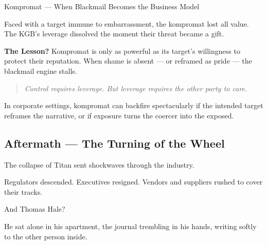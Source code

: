 \begin{HistoricalSidebar}{Kompromat --- When Blackmail Becomes the Business Model}
    \medskip
    
    Faced with a target immune to embarrassment, the kompromat lost all value.  
    The KGB’s leverage dissolved the moment their threat became a gift.
    
    \medskip
    
    \textbf{The Lesson?}  
    Kompromat is only as powerful as its target’s willingness to protect their reputation.  
    When shame is absent --- or reframed as pride --- the blackmail engine stalls.
    
    \begin{quote}
    \textit{Control requires leverage. But leverage requires the other party to care.}
    \end{quote}
    
    In corporate settings, kompromat can backfire spectacularly if the intended target reframes the narrative, or if exposure turns the coercer into the exposed.
    
\end{HistoricalSidebar}


\subsection{Aftermath --- The Turning of the Wheel}

The collapse of Titan sent shockwaves through the industry.  

Regulators descended.  
Executives resigned.  
Vendors and suppliers rushed to cover their tracks.

And Thomas Hale?

He sat alone in his apartment, the journal trembling in his hands, writing softly to the other person inside.

\medskip

